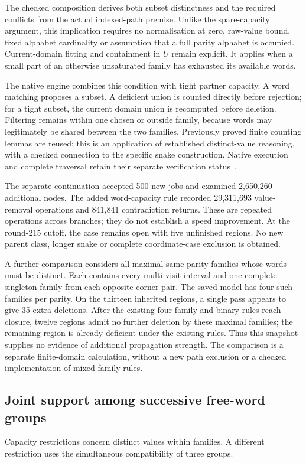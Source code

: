 \documentclass[11pt,a4paper]{article}
\theoremstyle{definition}
\theoremstyle{remark}
\begin{document}
The checked composition derives both subset distinctness and the required
conflicts from the actual indexed-path premise. Unlike the spare-capacity
argument, this implication requires no normalisation at zero, raw-value
bound, fixed alphabet cardinality or assumption that a full parity
alphabet is occupied. Current-domain fitting and containment in $U$
remain explicit. It applies when a small part of an otherwise
unsaturated family has exhausted its available words.

The native engine combines this condition with tight partner capacity.
A word matching proposes a subset. A deficient union is counted
directly before rejection; for a tight subset, the current domain
union is recomputed before deletion. Filtering remains within one
chosen or outside family, because words may legitimately be shared
between the two families. Previously proved finite counting lemmas
are reused; this is an application of established distinct-value
reasoning, with a checked connection to the specific snake construction.
Native execution and complete traversal retain their separate
verification status~\cite{research215}.

The separate continuation accepted 500 new jobs and examined 2,650,260 additional nodes. The added word-capacity rule recorded 29,311,693 value-removal operations and 841,841 contradiction returns. These are repeated operations across branches; they do not establish a speed improvement.
At the round-215 cutoff, the case remains open with five unfinished regions. No new parent class, longer snake or complete coordinate-case exclusion is obtained.

A further comparison considers all maximal same-parity families whose
words must be distinct. Each contains every multi-visit interval and
one complete singleton family from each opposite corner pair. The saved
model has four such families per parity. On the thirteen inherited
regions, a single pass appears to give 35 extra deletions. After the
existing four-family and binary rules reach closure, twelve regions
admit no further deletion by these maximal families; the remaining
region is already deficient under the existing rules. Thus this
snapshot supplies no evidence of additional propagation strength.
The comparison is a separate finite-domain calculation, without a
new path exclusion or a checked implementation of mixed-family rules.


\subsection{Joint support among successive free-word groups}
\label{sec:joint216}
Capacity restrictions concern distinct values within families. A different
restriction uses the simultaneous compatibility of three groups.
\end{document}
